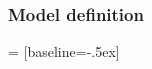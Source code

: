\documentclass{beamer}
\begin{document}
\begin{CJK*}{UTF8}{gbsn}
\begin{frame}
\frametitle{Model definition}
 = [baseline=-.5ex]
\begin{columns}
\begin{figure}
    \centering
    \resizebox{0.8\textwidth}{!}{}
\end{figure}
\begin{figure}
    \centering
    \resizebox{0.8\textwidth}{!}{}
\end{figure}
\begin{figure}
    \centering
    \resizebox{0.8\textwidth}{!}{}
\end{figure}
\begin{figure}
    \centering
    \resizebox{0.8\textwidth}{!}{}
\end{figure}
\end{columns}
\end{frame}


\end{CJK*}
\end{document}
